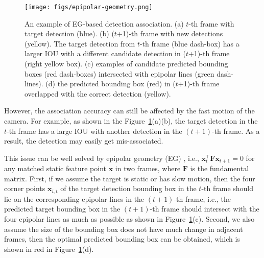 \documentclass[10pt,twocolumn,letterpaper]{article}
\begin{document}
\begin{figure}
\begin{center}
\texttt{[image: figs/epipolar-geometry.png]}
\end{center}
   \caption{An example of EG-based detection association. 
   (a) $t$-th frame with target detection (blue). 
   (b) ($t$+1)-th frame with new detections (yellow).
The target detection from $t$-th frame (blue dash-box) has a larger IOU with a different candidate detection in ($t$+1)-th frame (right yellow box). 
   (c) examples of candidate predicted bounding boxes (red dash-boxes) intersected with epipolar lines (green dash-lines). 
   (d) the predicted bounding box (red) in ($t$+1)-th frame overlapped with the correct detection (yellow). }
\label{fig:epi-geo}
\end{figure}

However, the association accuracy can still be affected by the fast motion of the camera. For example, as shown in the Figure~\ref{fig:epi-geo}(a)(b), the target detection in the $t$-th frame has a large IOU with another detection in the $(t+1)$-th frame. As a result, the detection may easily get mis-associated.

This issue can be well solved by epipolar geometry (EG) \cite{hartley2003multiple}, i.e., $\mathbf{x}_{t}^\top \mathbf{F} \mathbf{x}_{t+1}=0$ for any matched static feature point $\mathbf{x}$ in two frames, where $\mathbf{F}$ is the fundamental matrix.
First, if we assume the target is static or has slow motion, then the four corner points $\mathbf{x}_{i,t}$ of the target detection bounding box in the $t$-th frame should lie on the corresponding epipolar lines in the $(t+1)$-th frame, i.e., the predicted target bounding box in the $(t+1)$-th frame should intersect with the four epipolar lines as much as possible as shown in Figure~\ref{fig:epi-geo}(c). Second, we also assume the size of the bounding box does not have much change in adjacent frames, then the optimal predicted bounding box can be obtained, which is shown in red in Figure~\ref{fig:epi-geo}(d). 
\end{document}
